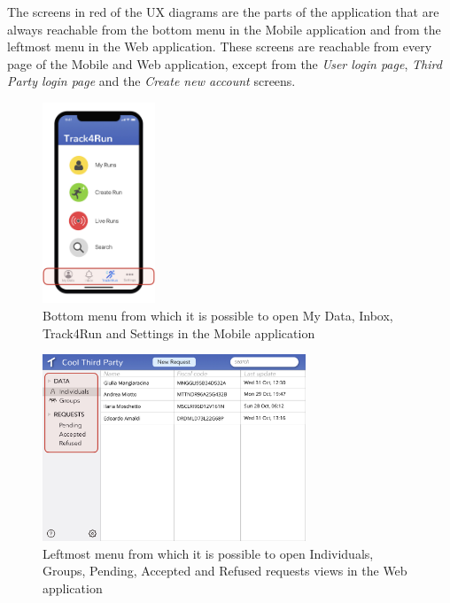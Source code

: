 The screens in red of the UX diagrams are the parts of the application that are always reachable from the bottom menu in the Mobile application and from the leftmost menu in the Web application. These screens are reachable from every page of the Mobile and Web application, except from the \textit{User login page}, \textit{Third Party login page} and the \textit{Create new account} screens.

\begin{figure}[H]

    \centering
    \includegraphics[width=0.3\textwidth]{./Pictures/ux-highlight-mobile.jpeg}
    \caption{Bottom menu from which it is possible to open My Data, Inbox, Track4Run and Settings in the Mobile application}
    
\end{figure}

\begin{figure}[H]

    \centering
    \includegraphics[width=0.7\textwidth]{./Pictures/ux-highlight-web.jpeg}
    \caption{Leftmost menu from which it is possible to open Individuals, Groups, Pending, Accepted and Refused requests views in the Web application}
    
\end{figure}